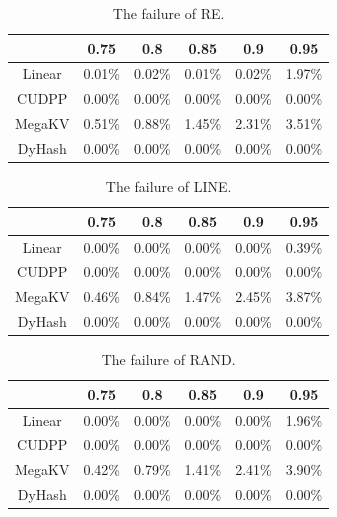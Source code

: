\begin{table}[H]
	\caption{The failure of RE.}
	\centering
    \begin{tabular}{|c|c|c|c|c|c|}
		\hline
		           & 0.75 & 0.8 & 0.85 & 0.9 & 0.95\\ \hline
		Linear &0.01\% & 0.02\% &0.01\%  & 0.02\% & 1.97\% \\ \hline
		CUDPP & 0.00\% & 0.00\% &0.00\%  & 0.00\% & 0.00\% \\ \hline
		MegaKV & 0.51\% & 0.88\% &1.45\%  & 2.31\% & 3.51\% \\ \hline
		DyHash &0.00\% & 0.00\% &0.00\%  & 0.00\% & 0.00\% \\ \hline
	\end{tabular}
	\label{tab:fail:re}
\end{table}

\begin{table}[H]
	\caption{The failure of LINE.}
	\centering
	\begin{tabular}{|c|c|c|c|c|c|}
		\hline
		& 0.75 & 0.8 & 0.85 & 0.9 & 0.95\\ \hline
		Linear &0.00\% & 0.00\% &0.00\%  & 0.00\% & 0.39\% \\ \hline
		CUDPP & 0.00\% & 0.00\% &0.00\%  & 0.00\% & 0.00\% \\ \hline
		MegaKV & 0.46\% & 0.84\% &1.47\%  & 2.45\% & 3.87\% \\ \hline
		DyHash &0.00\% & 0.00\% &0.00\%  & 0.00\% & 0.00\% \\ \hline
	\end{tabular}
	\label{tab:fail:line}
\end{table}

\begin{table}[H]
	\caption{The failure of RAND.}
	\centering
	\begin{tabular}{|c|c|c|c|c|c|}
		\hline
		& 0.75 & 0.8 & 0.85 & 0.9 & 0.95\\ \hline
		Linear &0.00\% & 0.00\% &0.00\%  & 0.00\% & 1.96\% \\ \hline
		CUDPP & 0.00\% & 0.00\% &0.00\%  & 0.00\% & 0.00\% \\ \hline
		MegaKV & 0.42\% & 0.79\% &1.41\%  & 2.41\% & 3.90\% \\ \hline
		DyHash &0.00\% & 0.00\% &0.00\%  & 0.00\% & 0.00\% \\ \hline
	\end{tabular}
	\label{tab:fail:rand}
\end{table}

